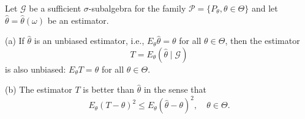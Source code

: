 Let $\mathcal{G}$ be a sufficient $\sigma$-subalgebra for the family $\mathcal{P} = \{P_{\theta}, \theta \in \Theta\}$ and let $\hat{\theta} = \hat{\theta}(\omega)$ be an estimator.

(a) If $\hat{\theta}$ is an unbiased estimator, i.e., $E_{\theta} \hat{\theta} = \theta$ for all $\theta \in \Theta$, then the estimator
$$T = E_{\theta}(\hat{\theta} \mid \mathcal{G})$$
is also unbiased: $E_{\theta} T = \theta$ for all $\theta \in \Theta$.

(b) The estimator $T$ is better than $\hat{\theta}$ in the sense that
$$E_{\theta}(T - \theta)^2 \leq E_{\theta}(\hat{\theta} - \theta)^2, \quad \theta \in \Theta.$$
